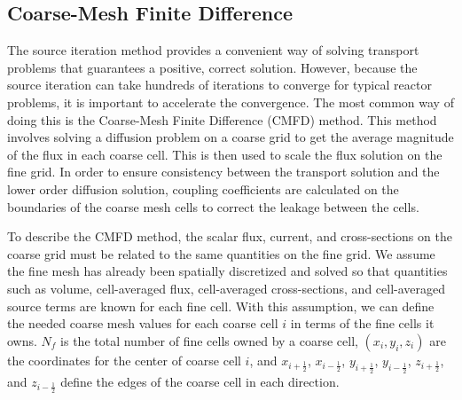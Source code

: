 
\subsection{Coarse-Mesh Finite Difference}\label{ss:CMFD}

The source iteration method provides a convenient way of solving transport problems that guarantees a positive, correct solution.  However, because the source iteration can take hundreds of iterations to converge for typical reactor problems, it is important to accelerate the convergence.  The most common way of doing this is the Coarse-Mesh Finite Difference (CMFD) method.  This method involves solving a diffusion problem on a coarse grid to get the average magnitude of the flux in each coarse cell.  This is then used to scale the flux solution on the fine grid.  In order to ensure consistency between the transport solution and the lower order diffusion solution, coupling coefficients are calculated on the boundaries of the coarse mesh cells to correct the leakage between the cells.

To describe the CMFD method, the scalar flux, current, and cross-sections on the coarse grid must be related to the same quantities on the fine grid.  We assume the fine mesh has already been spatially discretized and solved so that quantities such as volume, cell-averaged flux, cell-averaged cross-sections, and cell-averaged source terms are known for each fine cell.  With this assumption, we can define the needed coarse mesh values for each coarse cell $i$ in terms of the fine cells it owns.  $N_f$ is the total number of fine cells owned by a coarse cell, $\left(x_i,y_i,z_i\right)$ are the coordinates for the center of coarse cell $i$, and $x_{i+\frac{1}{2}}$, $x_{i-\frac{1}{2}}$, $y_{i+\frac{1}{2}}$, $y_{i-\frac{1}{2}}$, $z_{i+\frac{1}{2}}$, and $z_{i-\frac{1}{2}}$ define the edges of the coarse cell in each direction.

